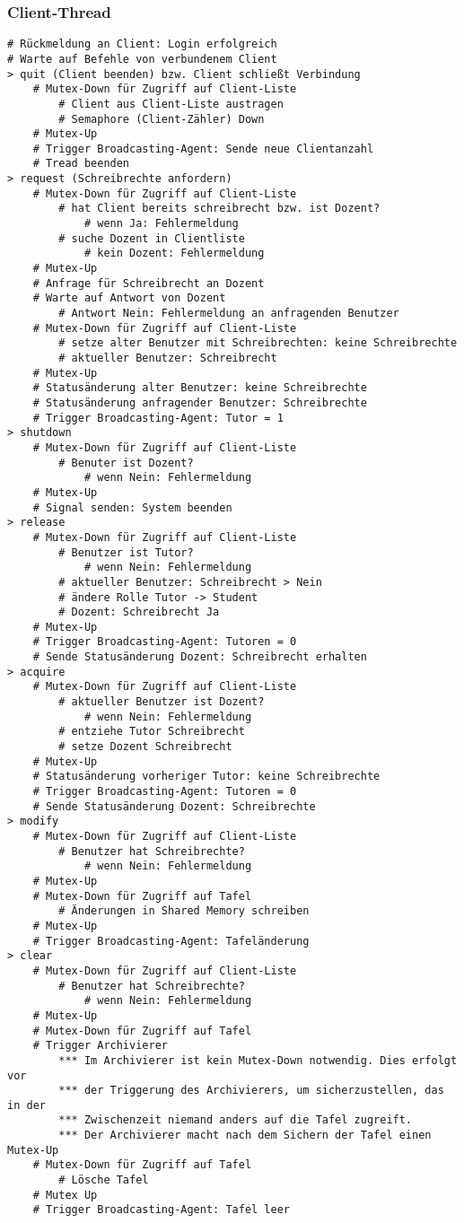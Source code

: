 \subsubsection{Client-Thread}
\begin{lstlisting}
# Rückmeldung an Client: Login erfolgreich
# Warte auf Befehle von verbundenem Client
> quit (Client beenden) bzw. Client schließt Verbindung
    # Mutex-Down für Zugriff auf Client-Liste
        # Client aus Client-Liste austragen
        # Semaphore (Client-Zähler) Down
    # Mutex-Up
    # Trigger Broadcasting-Agent: Sende neue Clientanzahl
    # Tread beenden
> request (Schreibrechte anfordern)
    # Mutex-Down für Zugriff auf Client-Liste
        # hat Client bereits schreibrecht bzw. ist Dozent?
            # wenn Ja: Fehlermeldung
        # suche Dozent in Clientliste
            # kein Dozent: Fehlermeldung
    # Mutex-Up
    # Anfrage für Schreibrecht an Dozent
    # Warte auf Antwort von Dozent
        # Antwort Nein: Fehlermeldung an anfragenden Benutzer
    # Mutex-Down für Zugriff auf Client-Liste
        # setze alter Benutzer mit Schreibrechten: keine Schreibrechte
        # aktueller Benutzer: Schreibrecht
    # Mutex-Up
    # Statusänderung alter Benutzer: keine Schreibrechte
    # Statusänderung anfragender Benutzer: Schreibrechte    
    # Trigger Broadcasting-Agent: Tutor = 1
> shutdown
    # Mutex-Down für Zugriff auf Client-Liste
        # Benuter ist Dozent?
            # wenn Nein: Fehlermeldung
    # Mutex-Up
    # Signal senden: System beenden
> release
    # Mutex-Down für Zugriff auf Client-Liste
        # Benutzer ist Tutor?
            # wenn Nein: Fehlermeldung
        # aktueller Benutzer: Schreibrecht > Nein
        # ändere Rolle Tutor -> Student
        # Dozent: Schreibrecht Ja
    # Mutex-Up
    # Trigger Broadcasting-Agent: Tutoren = 0
    # Sende Statusänderung Dozent: Schreibrecht erhalten
> acquire
    # Mutex-Down für Zugriff auf Client-Liste
        # aktueller Benutzer ist Dozent?
            # wenn Nein: Fehlermeldung
        # entziehe Tutor Schreibrecht
        # setze Dozent Schreibrecht
    # Mutex-Up
    # Statusänderung vorheriger Tutor: keine Schreibrechte
    # Trigger Broadcasting-Agent: Tutoren = 0
    # Sende Statusänderung Dozent: Schreibrechte
> modify
    # Mutex-Down für Zugriff auf Client-Liste
        # Benutzer hat Schreibrechte?
            # wenn Nein: Fehlermeldung
    # Mutex-Up
    # Mutex-Down für Zugriff auf Tafel
        # Änderungen in Shared Memory schreiben
    # Mutex-Up
    # Trigger Broadcasting-Agent: Tafeländerung
> clear
    # Mutex-Down für Zugriff auf Client-Liste
        # Benutzer hat Schreibrechte?
            # wenn Nein: Fehlermeldung
    # Mutex-Up
    # Mutex-Down für Zugriff auf Tafel
    # Trigger Archivierer
        *** Im Archivierer ist kein Mutex-Down notwendig. Dies erfolgt vor
        *** der Triggerung des Archivierers, um sicherzustellen, das in der
        *** Zwischenzeit niemand anders auf die Tafel zugreift.
        *** Der Archivierer macht nach dem Sichern der Tafel einen Mutex-Up
    # Mutex-Down für Zugriff auf Tafel
        # Lösche Tafel  
    # Mutex Up
    # Trigger Broadcasting-Agent: Tafel leer
\end{lstlisting}

